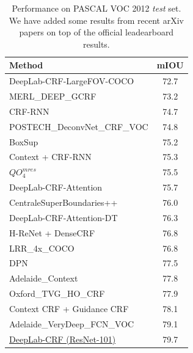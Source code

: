 \begin{table}[!th]
  \centering
  \addtolength{\tabcolsep}{2.5pt}
  \begin{tabular}{l | c}
    \toprule[0.2 em]
    {\bf Method} & {\bf mIOU} \\
    \toprule[0.2 em]
    DeepLab-CRF-LargeFOV-COCO \cite{papandreou2015weakly} & 72.7\\
    MERL\_DEEP\_GCRF \cite{Vemulapalli2016Gaussian} & 73.2 \\
    CRF-RNN \cite{zheng2015conditional} & 74.7 \\
    POSTECH\_DeconvNet\_CRF\_VOC \cite{noh2015learning} & 74.8 \\
    BoxSup \cite{dai2015boxsup} & 75.2 \\
    Context + CRF-RNN \cite{yu2015multi} & 75.3 \\
    $QO_4^{mres}$ \cite{chandra2016fast} & 75.5 \\
    DeepLab-CRF-Attention \cite{chen2015attention} & 75.7 \\
    CentraleSuperBoundaries++ \cite{kokkinos2016pushing} & 76.0 \\
    DeepLab-CRF-Attention-DT  \cite{chen2015semantic} & 76.3 \\
    H-ReNet + DenseCRF \cite{yan2016combining} & 76.8 \\
    LRR\_4x\_COCO \cite{ghiasi2016laplacian} & 76.8 \\
    DPN \cite{liu2015semantic} & 77.5 \\
    Adelaide\_Context \cite{lin2015efficient} & 77.8 \\
    Oxford\_TVG\_HO\_CRF \cite{arnab2015higher} & 77.9 \\
    Context CRF + Guidance CRF \cite{Shen2016Fast} & 78.1 \\
    Adelaide\_VeryDeep\_FCN\_VOC \cite{wu2016bridging} & 79.1 \\
    \midrule
    \href{http://host.robots.ox.ac.uk:8080/anonymous/FLHY8R.html}{DeepLab-CRF (ResNet-101)} & 79.7 \\
    \bottomrule[0.1 em]
  \end{tabular}
  \caption{Performance on PASCAL VOC 2012 {\it test} set. We have added some
    results from recent arXiv papers on top of the official leadearboard results.}
  \label{tab:res_testset}
\end{table}

